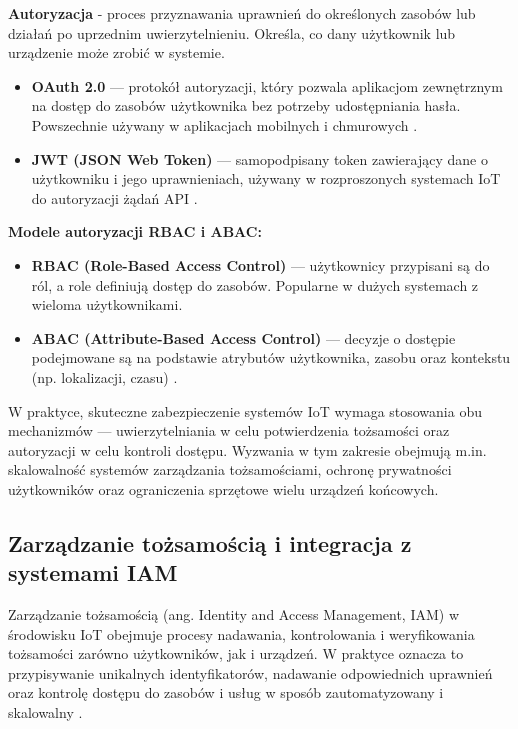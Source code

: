 \textbf{Autoryzacja} - proces przyznawania uprawnień do określonych zasobów lub działań po uprzednim uwierzytelnieniu. Określa, co dany użytkownik lub urządzenie może zrobić w systemie.
\begin{itemize}
    \item \textbf{OAuth 2.0} — protokół autoryzacji, który pozwala aplikacjom zewnętrznym na dostęp do zasobów użytkownika bez potrzeby udostępniania hasła. Powszechnie używany w aplikacjach mobilnych i chmurowych \cite{hardt2012oauth}.
    
    \item \textbf{JWT (JSON Web Token)} — samopodpisany token zawierający dane o użytkowniku i jego uprawnieniach, używany w rozproszonych systemach IoT do autoryzacji żądań API \cite{jones2015jwt}.
\end{itemize}

\textbf{Modele autoryzacji RBAC i ABAC:}
\begin{itemize}
    \item \textbf{RBAC (Role-Based Access Control)} — użytkownicy przypisani są do ról, a role definiują dostęp do zasobów. Popularne w dużych systemach z wieloma użytkownikami.
    
    \item \textbf{ABAC (Attribute-Based Access Control)} — decyzje o dostępie podejmowane są na podstawie atrybutów użytkownika, zasobu oraz kontekstu (np. lokalizacji, czasu) \cite{sicari2015security}.
\end{itemize}

W praktyce, skuteczne zabezpieczenie systemów IoT wymaga stosowania obu mechanizmów — uwierzytelniania w celu potwierdzenia tożsamości oraz autoryzacji w celu kontroli dostępu. Wyzwania w tym zakresie obejmują m.in. skalowalność systemów zarządzania tożsamościami, ochronę prywatności użytkowników oraz ograniczenia sprzętowe wielu urządzeń końcowych.

\subsection{Zarządzanie tożsamością i integracja z systemami IAM}

Zarządzanie tożsamością (ang. Identity and Access Management, IAM) w środowisku IoT obejmuje procesy nadawania, kontrolowania i weryfikowania tożsamości zarówno użytkowników, jak i urządzeń. W praktyce oznacza to przypisywanie unikalnych identyfikatorów, nadawanie odpowiednich uprawnień oraz kontrolę dostępu do zasobów i usług w sposób zautomatyzowany i skalowalny \cite{microsoftIAM}.

